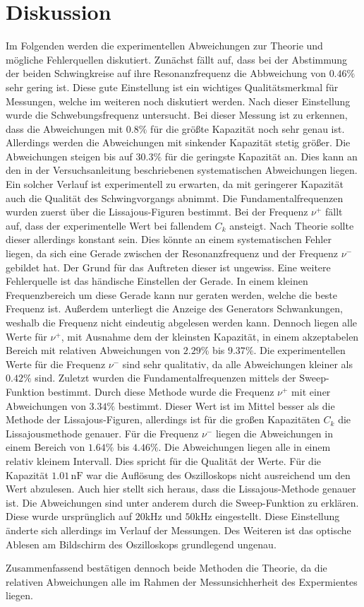 \section{Diskussion}
\label{sec:Diskussion}
Im Folgenden werden die experimentellen Abweichungen zur Theorie und mögliche Fehlerquellen diskutiert.
Zunächst fällt auf, dass bei der Abstimmung der beiden Schwingkreise auf ihre Resonanzfrequenz die Abbweichung von $0.46\%$ sehr gering ist. Diese gute Einstellung ist ein wichtiges Qualitätsmerkmal
für Messungen, welche im weiteren noch diskutiert werden. Nach dieser Einstellung wurde die Schwebungsfrequenz untersucht. Bei dieser Messung ist zu erkennen, dass die Abweichungen mit $0.8\%$ für
die größte Kapazität noch sehr genau ist. Allerdings werden die Abweichungen mit sinkender Kapazität stetig größer. Die Abweichungen steigen bis auf $30.3\%$ für die geringste Kapazität an. Dies 
kann an den in der Versuchsanleitung \cite{v355} beschriebenen systematischen Abweichungen liegen. Ein solcher Verlauf ist experimentell zu erwarten, da mit geringerer Kapazität 
auch die Qualität des Schwingvorgangs abnimmt. Die Fundamentalfrequenzen wurden zuerst über die Lissajous-Figuren bestimmt. Bei der Frequenz $\nu^+$ fällt auf, dass der experimentelle Wert
bei fallendem $C_k$ ansteigt. Nach Theorie sollte dieser allerdings konstant sein. Dies könnte an einem systematischen Fehler liegen, da sich eine Gerade zwischen der Resonanzfrequenz und der Frequenz
$\nu^-$ gebildet hat. Der Grund für das Auftreten dieser ist ungewiss. Eine weitere Fehlerquelle ist das händische Einstellen der Gerade. In einem kleinen Frequenzbereich um diese Gerade kann nur geraten werden, 
welche die beste Frequenz ist. Außerdem unterliegt die Anzeige des Generators Schwankungen, weshalb die Frequenz nicht eindeutig abgelesen werden kann. Dennoch liegen alle Werte
für $\nu^+$, mit Ausnahme dem der kleinsten Kapazität, in einem akzeptabelen Bereich mit relativen Abweichungen von $2.29\%$ bis $9.37\%$. Die experimentellen Werte für die Frequenz $\nu^-$ sind sehr 
qualitativ, da alle Abweichungen kleiner als $0.42\%$ sind. Zuletzt wurden die Fundamentalfrequenzen mittels der Sweep-Funktion bestimmt. Durch diese Methode wurde die Frequenz $\nu^+$ mit einer 
Abweichungen von $3.34\%$ bestimmt. Dieser Wert ist im Mittel besser als die Methode der Lissajous-Figuren, allerdings ist für die großen Kapazitäten
$C_k$ die Lissajousmethode genauer. Für die Frequenz $\nu^-$ liegen die Abweichungen in einem Bereich von $1.64\%$ bis $4.46\%$. Die Abweichungen liegen alle in einem relativ kleinem Intervall. 
Dies spricht für die Qualität der Werte. Für die Kapazität $1.01\, \unit{\nano\farad}$ war die Auflösung des Oszilloskops nicht ausreichend um den Wert abzulesen. Auch hier stellt sich heraus, 
dass die Lissajous-Methode 
genauer ist. Die Abweichungen sind unter anderem durch die Sweep-Funktion zu erklären. Diese wurde ursprünglich auf $20 \unit{\kilo\hertz}$ und $50 \unit{\kilo\hertz}$ eingestellt. 
Diese Einstellung änderte sich allerdings im Verlauf der Messungen. Des Weiteren ist das optische Ablesen am Bildschirm des Oszilloskops grundlegend ungenau.


Zusammenfassend bestätigen dennoch beide Methoden die Theorie, da die relativen Abweichungen alle im Rahmen der Messunsichherheit des Expermientes liegen. 